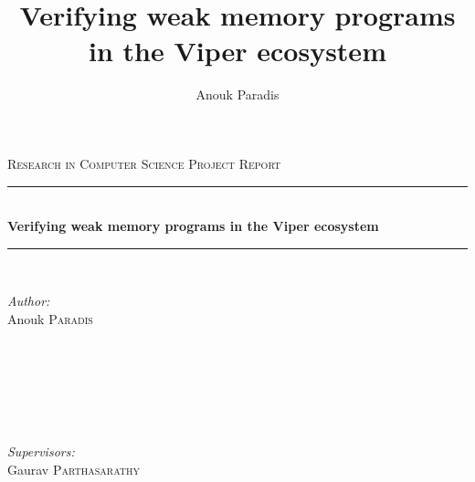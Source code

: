 \documentclass[titlepage,11pt,a4paper]{report}
\title{Verifying weak memory programs in the Viper ecosystem}
\author{Anouk Paradis}
\theoremstyle{plain}
\begin{document}
\begin{titlepage}

\newcommand{\HRule}{\rule{\linewidth}{0.5mm}} %

\center %
 

\textsc{\Large Research in Computer Science Project Report}\\[0.5cm] %


\HRule \\[0.4cm]
{ \huge \bfseries Verifying weak memory programs in the Viper ecosystem}\\[0.4cm] %
\HRule \\[1.5cm]


 

\begin{minipage}{0.4\textwidth}
\begin{flushleft} \large
\emph{Author:}\\
Anouk \textsc{Paradis} \\%
\textcolor{white}{ }\\
\textcolor{white}{ }\\
\textcolor{white}{ }\\
\textcolor{white}{ }\\
\end{flushleft}
\end{minipage}
~
\begin{minipage}{0.4\textwidth}
\begin{flushright} \large
\emph{Supervisors:} \\
Gaurav \textsc{Parthasarathy}\\ %


\end{flushright}
\end{minipage}
\end{titlepage}
\end{document}
